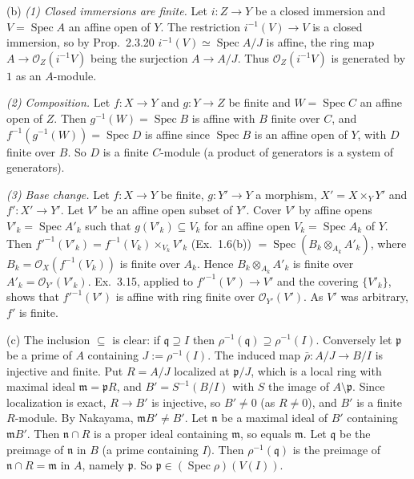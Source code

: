 \documentclass[11pt]{article}
\begin{document}
(b) \emph{(1) Closed immersions are finite.} Let $i:Z\to Y$ be a closed immersion and $V=\operatorname{Spec}A$ an affine open of $Y$. The restriction $i^{-1}(V)\to V$ is a closed immersion, so by Prop.~2.3.20 $i^{-1}(V)\simeq\operatorname{Spec}A/J$ is affine, the ring map $A\to\mathcal{O}_Z(i^{-1}V)$ being the surjection $A\to A/J$. Thus $\mathcal{O}_Z(i^{-1}V)$ is generated by $1$ as an $A$-module.

\emph{(2) Composition.} Let $f:X\to Y$ and $g:Y\to Z$ be finite and $W=\operatorname{Spec}C$ an affine open of $Z$. Then $g^{-1}(W)=\operatorname{Spec}B$ is affine with $B$ finite over $C$, and $f^{-1}(g^{-1}(W))=\operatorname{Spec}D$ is affine since $\operatorname{Spec}B$ is an affine open of $Y$, with $D$ finite over $B$. So $D$ is a finite $C$-module (a product of generators is a system of generators).

\emph{(3) Base change.} Let $f:X\to Y$ be finite, $g:Y'\to Y$ a morphism, $X'=X\times_YY'$ and $f':X'\to Y'$. Let $V'$ be an affine open subset of $Y'$. Cover $V'$ by affine opens $V'_k=\operatorname{Spec}A'_k$ such that $g(V'_k)\subseteq V_k$ for an affine open $V_k=\operatorname{Spec}A_k$ of $Y$. Then $f'^{-1}(V'_k)=f^{-1}(V_k)\times_{V_k}V'_k$ (Ex.~1.6(b)) $=\operatorname{Spec}(B_k\otimes_{A_k}A'_k)$, where $B_k=\mathcal{O}_X(f^{-1}(V_k))$ is finite over $A_k$. Hence $B_k\otimes_{A_k}A'_k$ is finite over $A'_k=\mathcal{O}_{Y'}(V'_k)$. Ex.~3.15, applied to $f'^{-1}(V')\to V'$ and the covering $\{V'_k\}$, shows that $f'^{-1}(V')$ is affine with ring finite over $\mathcal{O}_{Y'}(V')$. As $V'$ was arbitrary, $f'$ is finite.

(c) The inclusion $\subseteq$ is clear: if $\mathfrak q\supseteq I$ then $\rho^{-1}(\mathfrak q)\supseteq\rho^{-1}(I)$. Conversely let $\mathfrak p$ be a prime of $A$ containing $J:=\rho^{-1}(I)$. The induced map $\bar\rho:A/J\to B/I$ is injective and finite. Put $R=A/J$ localized at $\mathfrak p/J$, which is a local ring with maximal ideal $\mathfrak m=\mathfrak pR$, and $B'=S^{-1}(B/I)$ with $S$ the image of $A\setminus\mathfrak p$. Since localization is exact, $R\to B'$ is injective, so $B'\neq0$ (as $R\neq0$), and $B'$ is a finite $R$-module. By Nakayama, $\mathfrak mB'\neq B'$. Let $\mathfrak n$ be a maximal ideal of $B'$ containing $\mathfrak mB'$. Then $\mathfrak n\cap R$ is a proper ideal containing $\mathfrak m$, so equals $\mathfrak m$. Let $\mathfrak q$ be the preimage of $\mathfrak n$ in $B$ (a prime containing $I$). Then $\rho^{-1}(\mathfrak q)$ is the preimage of $\mathfrak n\cap R=\mathfrak m$ in $A$, namely $\mathfrak p$. So $\mathfrak p\in(\operatorname{Spec}\rho)(V(I))$.
\end{document}
